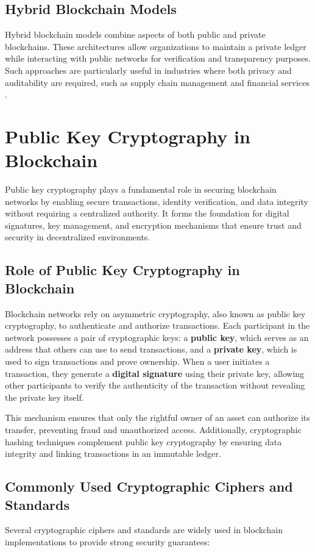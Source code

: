 \documentclass{article}
\begin{document}
\subsection{Hybrid Blockchain Models}
Hybrid blockchain models combine aspects of both public and private blockchains. These architectures allow organizations to maintain a private ledger while interacting with public networks for verification and transparency purposes. Such approaches are particularly useful in industries where both privacy and auditability are required, such as supply chain management and financial services \cite{zhao2019blockchain}.


\section*{Public Key Cryptography in Blockchain}

Public key cryptography plays a fundamental role in securing blockchain networks by enabling secure transactions, identity verification, and data integrity without requiring a centralized authority. It forms the foundation for digital signatures, key management, and encryption mechanisms that ensure trust and security in decentralized environments.

\subsection*{Role of Public Key Cryptography in Blockchain}
Blockchain networks rely on asymmetric cryptography, also known as public key cryptography, to authenticate and authorize transactions. Each participant in the network possesses a pair of cryptographic keys: a \textbf{public key}, which serves as an address that others can use to send transactions, and a \textbf{private key}, which is used to sign transactions and prove ownership. When a user initiates a transaction, they generate a \textbf{digital signature} using their private key, allowing other participants to verify the authenticity of the transaction without revealing the private key itself.

This mechanism ensures that only the rightful owner of an asset can authorize its transfer, preventing fraud and unauthorized access. Additionally, cryptographic hashing techniques complement public key cryptography by ensuring data integrity and linking transactions in an immutable ledger.

\subsection*{Commonly Used Cryptographic Ciphers and Standards}
Several cryptographic ciphers and standards are widely used in blockchain implementations to provide strong security guarantees:
\end{document}
